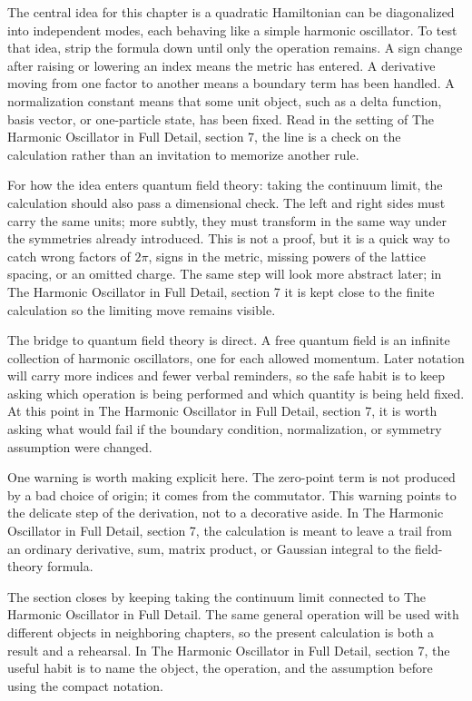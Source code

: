 The central idea for this chapter is a quadratic Hamiltonian can be diagonalized into independent modes, each behaving like a simple harmonic oscillator.  To test that idea, strip the formula down until only the operation remains.  A sign change after raising or lowering an index means the metric has entered.  A derivative moving from one factor to another means a boundary term has been handled.  A normalization constant means that some unit object, such as a delta function, basis vector, or one-particle state, has been fixed.  Read in the setting of The Harmonic Oscillator in Full Detail, section 7, the line is a check on the calculation rather than an invitation to memorize another rule.

For how the idea enters quantum field theory: taking the continuum limit, the calculation should also pass a dimensional check.  The left and right sides must carry the same units; more subtly, they must transform in the same way under the symmetries already introduced.  This is not a proof, but it is a quick way to catch wrong factors of \(2\pi\), signs in the metric, missing powers of the lattice spacing, or an omitted charge.  The same step will look more abstract later; in The Harmonic Oscillator in Full Detail, section 7 it is kept close to the finite calculation so the limiting move remains visible.

The bridge to quantum field theory is direct.  A free quantum field is an infinite collection of harmonic oscillators, one for each allowed momentum.  Later notation will carry more indices and fewer verbal reminders, so the safe habit is to keep asking which operation is being performed and which quantity is being held fixed.  At this point in The Harmonic Oscillator in Full Detail, section 7, it is worth asking what would fail if the boundary condition, normalization, or symmetry assumption were changed.

One warning is worth making explicit here.  The zero-point term is not produced by a bad choice of origin; it comes from the commutator.  This warning points to the delicate step of the derivation, not to a decorative aside.  In The Harmonic Oscillator in Full Detail, section 7, the calculation is meant to leave a trail from an ordinary derivative, sum, matrix product, or Gaussian integral to the field-theory formula.

The section closes by keeping taking the continuum limit connected to The Harmonic Oscillator in Full Detail.  The same general operation will be used with different objects in neighboring chapters, so the present calculation is both a result and a rehearsal.  In The Harmonic Oscillator in Full Detail, section 7, the useful habit is to name the object, the operation, and the assumption before using the compact notation.



